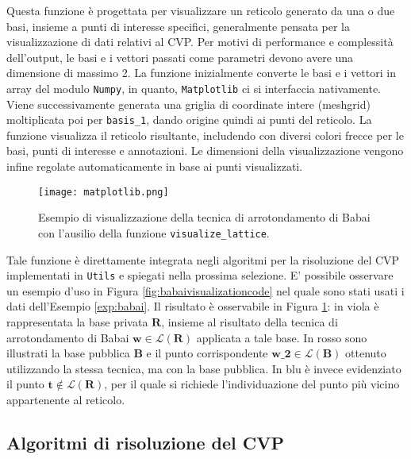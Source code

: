 Questa funzione è progettata per visualizzare un reticolo generato da una o due basi, 
insieme a punti di interesse specifici, generalmente pensata per la visualizzazione di dati
relativi al CVP. Per motivi di performance e complessità dell'output, le basi e i vettori 
passati come parametri devono avere una dimensione di massimo 2. 
La funzione inizialmente converte le basi e i vettori in array del modulo 
\texttt{Numpy}, in quanto, \texttt{Matplotlib} ci si interfaccia nativamente. 
Viene successivamente generata una griglia di coordinate intere (meshgrid) moltiplicata poi 
per \texttt{basis\_1}, dando origine quindi ai punti del reticolo.
La funzione visualizza il reticolo risultante, includendo con diversi colori
frecce per le basi, punti di interesse e annotazioni. Le dimensioni della visualizzazione 
vengono infine regolate automaticamente in base ai punti visualizzati. 

\begin{figure}[H]
    \centering
    \texttt{[image: matplotlib.png]}
    \caption{Esempio di visualizzazione della tecnica di arrotondamento di Babai con l'ausilio
    della funzione \texttt{visualize\_lattice}.}
    \label{fig:babaivisualizationout}
\end{figure}

Tale funzione è direttamente integrata negli algoritmi per la risoluzione del CVP
implementati in \texttt{Utils} e spiegati nella prossima selezione. 
E' possibile osservare un esempio d'uso in Figura \ref{fig:babaivisualizationcode} nel
quale sono stati usati i dati dell'Esempio \ref{exp:babai}. Il risultato è osservabile 
in Figura \ref{fig:babaivisualizationout}: in viola è rappresentata la base privata $\mathbf{R}$, 
insieme al risultato della tecnica di arrotondamento di Babai 
$\mathbf{w} \in \mathcal{L}(\mathbf{R})$ applicata a tale base.
In rosso sono illustrati la base pubblica $\mathbf{B}$ e il punto corrispondente 
$\mathbf{w\_2} \in \mathcal{L}(\mathbf{B})$ ottenuto utilizzando 
la stessa tecnica, ma con la base pubblica. In blu è invece 
evidenziato il punto $\mathbf{t} \notin \mathcal{L}(\mathbf{R})$, per il quale si richiede 
l'individuazione del punto più vicino appartenente al reticolo.


\subsection{Algoritmi di risoluzione del CVP}

